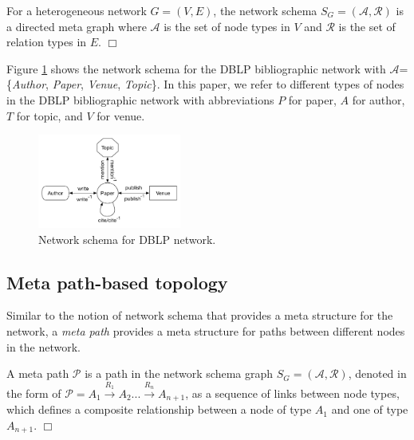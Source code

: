 \begin{definition}
For a heterogeneous network $G=(V,E)$, the network schema $S_G=\mathcal{(A,R)}$ is a directed meta graph where $\mathcal{A}$ is the set of node types in $V$ and $\mathcal{R}$ is the set of relation types in $E$.  $\Box$
\end{definition}

Figure \ref{schema} shows the network schema for the DBLP bibliographic network with $\mathcal{A}$=\{\textit{Author}, \textit{Paper}, \textit{Venue}, \textit{Topic}\}. %
In this paper, we refer to different types of nodes in the DBLP bibliographic network with abbreviations $P$ for paper, $A$ for author, $T$ for topic, and $V$ for venue. 

\begin{figure}[t]
  \centering
      \includegraphics[trim = 0mm 10mm 0mm 0mm,width=0.42\textwidth]{figs/schema.pdf}
  \caption{Network schema for DBLP network.}\label{schema}
\end{figure}

\subsection{Meta path-based topology}

Similar to the notion of network schema that provides a meta structure for the network, a \textit{meta path} \cite{sun2011pathsim} provides a meta structure for paths between different nodes in the network. 

\begin{definition}
A meta path $\mathcal{P}$ is a path in the network schema graph $S_G = (\mathcal{A,R})$, denoted in the form of $\mathcal{P} = A_1 \xrightarrow{R_1} A_2... \xrightarrow{R_n} A_{n+1}$, as a sequence of links between node types, which defines a composite relationship between a node of type $A_1$ and one of type $A_{n+1}$. $\Box$
\end{definition}



